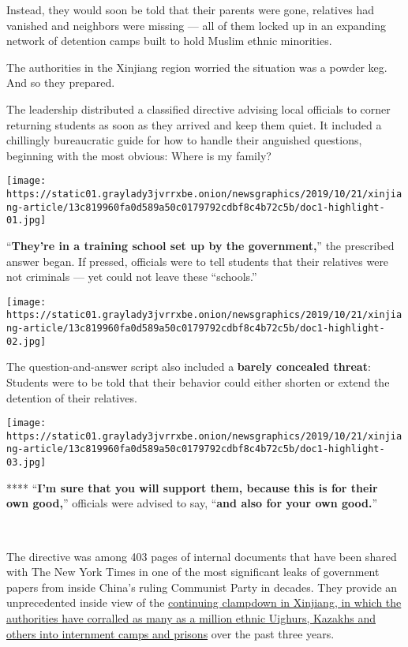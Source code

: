 Instead, they would soon be told that their parents were gone, relatives
had vanished and neighbors were missing --- all of them locked up in an
expanding network of detention camps built to hold Muslim ethnic
minorities.

The authorities in the Xinjiang region worried the situation was a
powder keg. And so they prepared.

The leadership distributed a classified directive advising local
officials to corner returning students as soon as they arrived and keep
them quiet. It included a chillingly bureaucratic guide for how to
handle their anguished questions, beginning with the most obvious: Where
is my family?

\texttt{[image: https://static01.graylady3jvrrxbe.onion/newsgraphics/2019/10/21/xinjiang-article/13c819960fa0d589a50c0179792cdbf8c4b72c5b/doc1-highlight-01.jpg]}

``\textbf{They're in a training school set up by the government,}'' the
prescribed answer began. If pressed, officials were to tell students
that their relatives were not criminals --- yet could not leave these
``schools.''

\texttt{[image: https://static01.graylady3jvrrxbe.onion/newsgraphics/2019/10/21/xinjiang-article/13c819960fa0d589a50c0179792cdbf8c4b72c5b/doc1-highlight-02.jpg]}

The question-and-answer script also included a \textbf{barely concealed
threat}: Students were to be told that their behavior could either
shorten or extend the detention of their relatives.

\texttt{[image: https://static01.graylady3jvrrxbe.onion/newsgraphics/2019/10/21/xinjiang-article/13c819960fa0d589a50c0179792cdbf8c4b72c5b/doc1-highlight-03.jpg]}

 **** ``\textbf{I'm sure that you will support them, because this is for
their own good,}'' officials were advised to say, ``\textbf{and also for
your own good.}''

​

The directive was among 403 pages of internal documents that have been
shared with The New York Times in one of the most significant leaks of
government papers from inside China's ruling Communist Party in decades.
They provide an unprecedented inside view of the
\href{https://www.nytimes3xbfgragh.onion/2018/09/08/world/asia/china-uighur-muslim-detention-camp.html}{continuing
clampdown in Xinjiang, in which the authorities have corralled as many
as a million ethnic Uighurs, Kazakhs and others into internment camps
and prisons} over the past three years.


